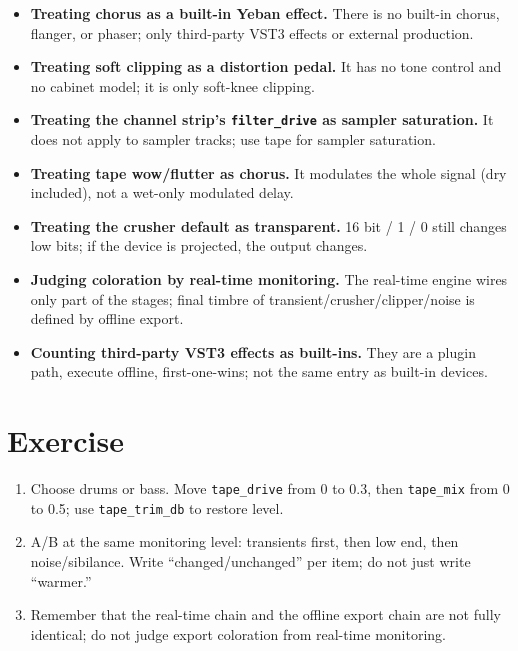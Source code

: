 \begin{itemize}
  \item \textbf{Treating chorus as a built-in Yeban effect.} There is no built-in chorus, flanger, or phaser; only third-party VST3 effects or external production.
  \item \textbf{Treating soft clipping as a distortion pedal.} It has no tone control and no cabinet model; it is only soft-knee clipping.
  \item \textbf{Treating the channel strip's \texttt{filter\_drive} as sampler saturation.} It does not apply to sampler tracks; use tape for sampler saturation.
  \item \textbf{Treating tape wow/flutter as chorus.} It modulates the whole signal (dry included), not a wet-only modulated delay.
  \item \textbf{Treating the crusher default as transparent.} 16 bit / 1 / 0 still changes low bits; if the device is projected, the output changes.
  \item \textbf{Judging coloration by real-time monitoring.} The real-time engine wires only part of the stages; final timbre of transient/crusher/clipper/noise is defined by offline export.
  \item \textbf{Counting third-party VST3 effects as built-ins.} They are a plugin path, execute offline, first-one-wins; not the same entry as built-in devices.
\end{itemize}

\section{Exercise}


\begin{exercise}
\begin{enumerate}
  \item Choose drums or bass. Move \texttt{tape\_drive} from 0 to 0.3, then \texttt{tape\_mix} from 0 to 0.5; use \texttt{tape\_trim\_db} to restore level.
  \item A/B at the same monitoring level: transients first, then low end, then noise/sibilance. Write ``changed/unchanged'' per item; do not just write ``warmer.''
  \item Remember that the real-time chain and the offline export chain are not fully identical; do not judge export coloration from real-time monitoring.
\end{enumerate}
\end{exercise}

